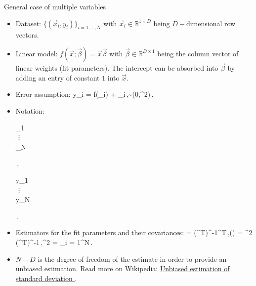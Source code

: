 \documentclass[10pt,aspectratio=169,handout]{beamer}
\begin{document}
\begin{frame}{General case of multiple variables}
	\begin{itemize}[<+->]
		\item Dataset: $\{(\vec{x}_i,y_i)\}_{i=1,...,N}$ with $\vec{x}_i\in\mathbb{R}^{1\times D}$ being $D-$dimensional row vectors.
		\item Linear model: $f(\vec{x};\vec{\beta}) = \vec{x}\vec{\beta}$ with $\vec{\beta}\in\mathbb{R}^{D\times 1}$ being the column vector of linear weights (fit parameters). The intercept can be absorbed into $\vec{\beta}$ by adding an entry of constant $1$ into $\vec{x}$.
		\item Error assumption:
		\bea
			y_i = f(_i) + \varepsilon_i\,,\quad \varepsilon\sim\ncal(0,\sigma^2)\,.
		\eea

		\item Notation:
		\bea
		 \equiv \begin{bmatrix}
			_1 \\
			\vdots \\
			_N
		\end{bmatrix}\,,\quad 
		 \equiv  \begin{bmatrix}
			y_1\\
			\vdots \\
			y_N
		\end{bmatrix}\,.
	\eea
	\item Estimators for the fit parameters and their covariances:
	\bea
		\hat{\vec{\beta}} = (^T)^{-1}^T\,,\quad {}(\hat{\vec{\beta}}) = \sigmahat^2  (^T)^{-1}\,,\quad \sigmahat^2 = \sum_{i = 1}^N\dfrac{\varepsilon_i^2}{N - D}\,.
	\eea
	\item $N-D$ is the degree of freedom of the estimate in order to provide an unbiased estimation. Read more on Wikipedia:  \href{https://en.wikipedia.org/wiki/Unbiased_estimation_of_standard_deviation}{Unbiased estimation of standard deviation
	}.
	\end{itemize}

\end{frame}
\end{document}
